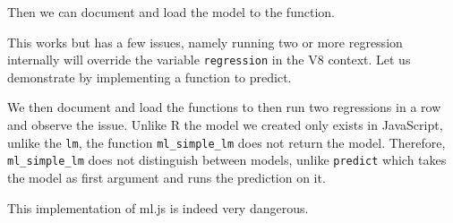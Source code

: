 \documentclass[
]{krantz}
\makeatletter
\newenvironment{Shaded}{\begin{snugshade}}{\end{snugshade}}
\newcommand{\CommentTok}[1]{\textcolor[rgb]{0.37,0.37,0.37}{\textit{#1}}}
\newcommand{\ControlFlowTok}[1]{\textcolor[rgb]{0.27,0.27,0.27}{\textbf{#1}}}
\newcommand{\DecValTok}[1]{\textcolor[rgb]{0.06,0.06,0.06}{#1}}
\newcommand{\KeywordTok}[1]{\textcolor[rgb]{0.27,0.27,0.27}{\textbf{#1}}}
\newcommand{\NormalTok}[1]{#1}
\newcommand{\OperatorTok}[1]{\textcolor[rgb]{0.43,0.43,0.43}{\textbf{#1}}}
\newcommand{\StringTok}[1]{\textcolor[rgb]{0.5,0.5,0.5}{#1}}
\newenvironment{kframe}{%
\medskip{}
\setlength{\fboxsep}{.8em}
 \def\at@end@of@kframe{}%
 \ifinner\ifhmode%
  \def\at@end@of@kframe{\end{minipage}}%
  \begin{minipage}{\columnwidth}%
 \fi\fi%
 \def\FrameCommand##1{\hskip\@totalleftmargin \hskip-\fboxsep
 \colorbox{shadecolor}{##1}\hskip-\fboxsep
     \hskip-\linewidth \hskip-\@totalleftmargin \hskip\columnwidth}%
 \MakeFramed {\advance\hsize-\width
   \@totalleftmargin\z@ \linewidth\hsize
   \@setminipage}}%
 {\par\unskip\endMakeFramed%
 \at@end@of@kframe}
\renewenvironment{Shaded}{\begin{kframe}}{\end{kframe}}
\makeatother
\begin{document}
Then we can document and load the model to the function.

\begin{Shaded}
\end{Shaded}

This works but has a few issues, namely running two or more regression internally will override the variable \texttt{regression} in the V8 context. Let us demonstrate by implementing a function to predict.

\begin{Shaded}
\end{Shaded}

We then document and load the functions to then run two regressions in a row and observe the issue. Unlike R the model we created only exists in JavaScript, unlike the \texttt{lm}, the function \texttt{ml\_simple\_lm} does not return the model. Therefore, \texttt{ml\_simple\_lm} does not distinguish between models, unlike \texttt{predict} which takes the model as first argument and runs the prediction on it.

This implementation of ml.js is indeed very dangerous.

\begin{Shaded}
\end{Shaded}
\end{document}
